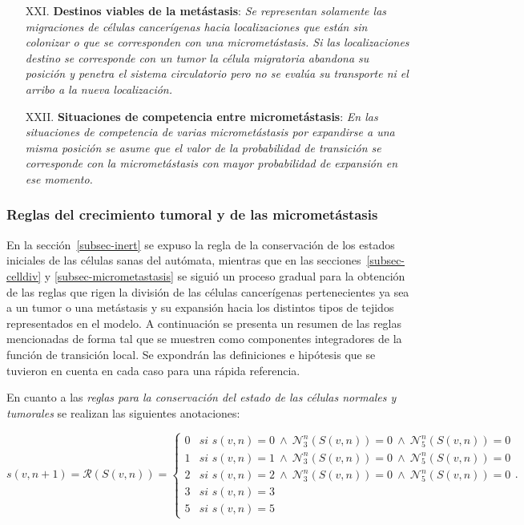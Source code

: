 \begin{enumerate}
\item [XXI.] \textbf{Destinos viables de la met\'astasis}: \emph{Se representan solamente las migraciones de c\'elulas cancer\'igenas hacia localizaciones que est\'an sin colonizar o que se corresponden con una micromet\'astasis. Si las localizaciones destino se corresponde con un tumor la c\'elula migratoria abandona su posici\'on y penetra el sistema circulatorio pero no se eval\'ua su transporte ni el arribo a la nueva localizaci\'on.} \label{hXXI}

\item [{XXII.}] \textbf{Situaciones de competencia entre micromet\'astasis}: \emph{En las situaciones de competencia de varias micromet\'astasis por expandirse a una misma posici\'on se asume que el valor de la probabilidad de transici\'on se corresponde con la micromet\'astasis con mayor probabilidad de expansi\'on en ese momento.} \label{hXXII}
\end{enumerate}

\subsubsection*{Reglas del crecimiento tumoral y de las micromet\'astasis} 
En la secci\'on~\ref{subsec-inert} se expuso la regla de la conservaci\'on de los estados iniciales de las c\'elulas sanas del aut\'omata, mientras que en las secciones~\ref{subsec-celldiv} y \ref{subsec-micrometastasis} se sigui\'o un proceso gradual para la obtenci\'on de las reglas que rigen la divisi\'on de las c\'elulas cancer\'igenas pertenecientes ya sea a un tumor o una met\'astasis y su expansi\'on hacia los distintos tipos de tejidos representados en el modelo. A continuaci\'on se presenta un resumen de las reglas mencionadas de forma tal que se muestren como componentes integradores de la funci\'on de transici\'on local. Se expondr\'an las definiciones e hip\'otesis que se tuvieron en cuenta en cada caso para una r\'apida referencia. 

En cuanto a las \emph{reglas para la conservaci\'on del estado de las c\'elulas normales y tumorales} se realizan las siguientes anotaciones:\label{NOT-conservacion-estado}

\begin{equation*}
s(v,n+1)=\mathcal{R}(S(v,n))=\left\lbrace
	\begin{array}{ll}
		0 & \textit{si } s(v,n)=0~\wedge~\mathcal{N}_3^n(S(v,n))=0~\wedge~\mathcal{N}_5^n(S(v,n))=0\\
		1 & \textit{si } s(v,n)=1~\wedge~\mathcal{N}_3^n(S(v,n))=0~\wedge~\mathcal{N}_5^n(S(v,n))=0\\
		2 & \textit{si } s(v,n)=2~\wedge~\mathcal{N}_3^n(S(v,n))=0~\wedge~\mathcal{N}_5^n(S(v,n))=0\\
		3 & \textit{si } s(v,n)=3 \\
		5 & \textit{si } s(v,n)=5
	\end{array}
\right..
\end{equation*}

